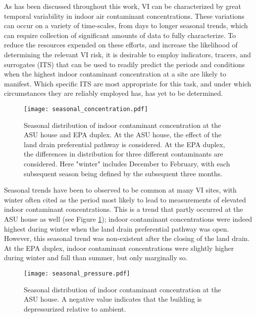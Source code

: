 As has been discussed throughout this work, VI can be characterized by great temporal variability in indoor air contaminant concentrations.
These variations can occur on a variety of time-scales, from days to longer seasonal trends, which can require collection of significant amounts of data to fully characterize.
To reduce the resources expended on these efforts, and increase the likelihood of determining the relevant VI risk, it is desirable to employ indicators, tracers, and surrogates (ITS) that can be used to readily predict the periods and conditions when the highest indoor contaminant concentration at a site are likely to manifest.
Which specific ITS are most appropriate for this task, and under which circumstances they are reliably employed has, has yet to be determined.\par

\begin{figure}[htb!]
  \centering
  \texttt{[image: seasonal\_concentration.pdf]}
  \caption[Seasonal distribution of indoor contaminant concentration at the ASU house and EPA duplex.]{Seasonal distribution of indoor contaminant concentration at the ASU house and EPA duplex. At the ASU house, the effect of the land drain preferential pathway is considered. At the EPA duplex, the differences in distribution for three different contaminants are considered. Here "winter" includes December to February, with each subsequent season being defined by the subsequent three months.}
  \label{fig:seasonal_concentration}
\end{figure}

Seasonal trends have been to observed to be common at many VI sites, with winter often cited as the period most likely to lead to measurements of elevated indoor contaminant concentrations\cite{burke_estimation_2010,hers_evaluation_2014,miles_temporal_2001,schumacher_fluctuation_2012,steck_indoor_2004}.
This is a trend that partly occurred at the ASU house as well (see Figure \ref{fig:seasonal_concentration}); indoor contaminant concentrations were indeed highest during winter when the land drain preferential pathway was open.
However, this seasonal trend was non-existent after the closing of the land drain.
At the EPA duplex, indoor contaminant concentrations were slightly higher during winter and fall than summer, but only marginally so.\par

\begin{figure}[htb!]
  \centering
  \texttt{[image: seasonal\_pressure.pdf]}
  \caption[Seasonal distribution of indoor contaminant concentration at the ASU house.]{Seasonal distribution of indoor contaminant concentration at the ASU house. A negative value indicates that the building is depressurized relative to ambient.}
  \label{fig:seasonal_pressure}
\end{figure}

